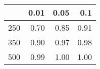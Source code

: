 % 
\begin{tabular}{rrrr}
  \hline
 & 0.01 & 0.05 & 0.1 \\ 
  \hline
250 & 0.70 & 0.85 & 0.91 \\ 
  350 & 0.90 & 0.97 & 0.98 \\ 
  500 & 0.99 & 1.00 & 1.00 \\ 
   \hline
\end{tabular}
